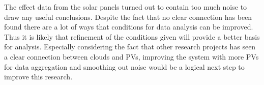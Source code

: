The effect data from the solar panels turned out to contain too much
noise to draw any useful conclusions.  Despite the fact that no clear
connection has been found there are a lot of ways that conditions for
data analysis can be improved.  Thus it is likely that refinement of
the conditions given will provide a better basis for analysis.
Especially considering the fact that other research projects has seen
a clear connection between clouds and PVs, improving the system with
more PVs for data aggregation and smoothing out noise would be a
logical next step to improve this research.

